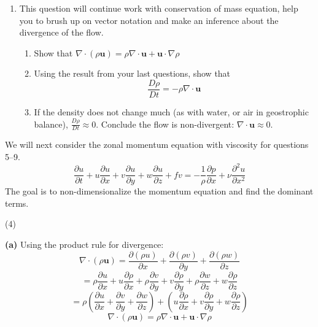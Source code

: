 \documentclass[letterpaper, 11pt]{article}
\newcommand{\1}{\mathds{1}}	%
\theoremstyle{definition}
\begin{document}
\begin{enumerate}
\[
\boxed{\frac{\partial \rho}{\partial t} = -\frac{\partial(\rho u)}{\partial x} - \frac{\partial(\rho v)}{\partial y} - \frac{\partial(\rho w)}{\partial z} = -\nabla \cdot (\rho \mathbf{u})}
\]

\item This question will continue work with conservation of mass equation, help you to brush up on vector notation and make an inference about the divergence of the flow.

\begin{enumerate}[label=(\alph*)]
\item Show that $\nabla \cdot (\rho\mathbf{u}) = \rho\nabla \cdot \mathbf{u} + \mathbf{u} \cdot \nabla\rho$
\item Using the result from your last questions, show that
\[
\frac{D\rho}{Dt} = -\rho\nabla \cdot \mathbf{u}
\]
\item If the density does not change much (as with water, or air in geostrophic balance), $\frac{D\rho}{Dt} \approx 0$. Conclude the flow is non-divergent: $\nabla \cdot \mathbf{u} \approx 0$.
\end{enumerate}

\end{enumerate}

\bigskip

We will next consider the zonal momentum equation with viscosity for questions 5--9.
\[
\frac{\partial u}{\partial t} + u\frac{\partial u}{\partial x} + v\frac{\partial u}{\partial y} + w\frac{\partial u}{\partial z} + fv = -\frac{1}{\rho}\frac{\partial p}{\partial x} + \nu\frac{\partial^2 u}{\partial x^2}
\]
The goal is to non-dimensionalize the momentum equation and find the dominant terms.

(4)

  \textbf{(a)} Using the product rule for divergence:
\[
\nabla \cdot (\rho \mathbf{u}) = \frac{\partial(\rho u)}{\partial x} + \frac{\partial(\rho v)}{\partial y} + \frac{\partial(\rho w)}{\partial z}
\]
\[
= \rho\frac{\partial u}{\partial x} + u\frac{\partial \rho}{\partial x} + \rho\frac{\partial v}{\partial y} + v\frac{\partial \rho}{\partial y} + \rho\frac{\partial w}{\partial z} + w\frac{\partial \rho}{\partial z}
\]
\[
= \rho\left(\frac{\partial u}{\partial x} + \frac{\partial v}{\partial y} + \frac{\partial w}{\partial z}\right) + \left(u\frac{\partial \rho}{\partial x} + v\frac{\partial \rho}{\partial y} + w\frac{\partial \rho}{\partial z}\right)
\]
\[
\boxed{\nabla \cdot (\rho \mathbf{u}) = \rho \nabla \cdot \mathbf{u} + \mathbf{u} \cdot \nabla \rho}
\]
\end{document}
